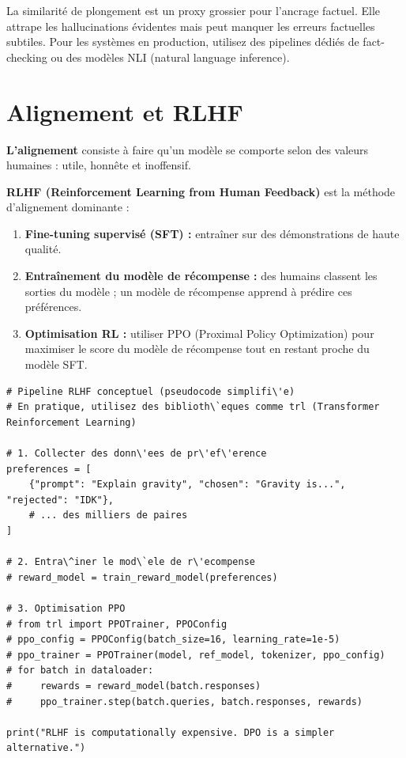 \begin{warningbox}
La similarit\'e de plongement est un proxy grossier pour l'ancrage factuel. Elle attrape les hallucinations \'evidentes mais peut manquer les erreurs factuelles subtiles. Pour les syst\`emes en production, utilisez des pipelines d\'edi\'es de fact-checking ou des mod\`eles NLI (natural language inference).
\end{warningbox}

\section{Alignement et RLHF}

\textbf{L'alignement} consiste \`a faire qu'un mod\`ele se comporte selon des valeurs humaines : utile, honn\^ete et inoffensif.

\textbf{RLHF (Reinforcement Learning from Human Feedback)} est la m\'ethode d'alignement dominante :
\begin{enumerate}
  \item \textbf{Fine-tuning supervis\'e (SFT) :} entra\^iner sur des d\'emonstrations de haute qualit\'e.
  \item \textbf{Entra\^inement du mod\`ele de r\'ecompense :} des humains classent les sorties du mod\`ele ; un mod\`ele de r\'ecompense apprend \`a pr\'edire ces pr\'ef\'erences.
  \item \textbf{Optimisation RL :} utiliser PPO (Proximal Policy Optimization) pour maximiser le score du mod\`ele de r\'ecompense tout en restant proche du mod\`ele SFT.
\end{enumerate}

\begin{verbatim}
# Pipeline RLHF conceptuel (pseudocode simplifi\'e)
# En pratique, utilisez des biblioth\`eques comme trl (Transformer Reinforcement Learning)

# 1. Collecter des donn\'ees de pr\'ef\'erence
preferences = [
    {"prompt": "Explain gravity", "chosen": "Gravity is...", "rejected": "IDK"},
    # ... des milliers de paires
]

# 2. Entra\^iner le mod\`ele de r\'ecompense
# reward_model = train_reward_model(preferences)

# 3. Optimisation PPO
# from trl import PPOTrainer, PPOConfig
# ppo_config = PPOConfig(batch_size=16, learning_rate=1e-5)
# ppo_trainer = PPOTrainer(model, ref_model, tokenizer, ppo_config)
# for batch in dataloader:
#     rewards = reward_model(batch.responses)
#     ppo_trainer.step(batch.queries, batch.responses, rewards)

print("RLHF is computationally expensive. DPO is a simpler alternative.")
\end{verbatim}

